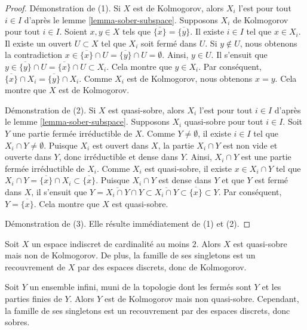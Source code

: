 \begin{proof}
Démonstration de (1). Si $X$ est de Kolmogorov, alors $X_i$ l'est pour tout
$i\in I$ d'après le lemme \ref{lemma-sober-subspace}. Supposons $X_i$ de
Kolmogorov pour tout $i\in I$. Soient $x,y\in X$ tels que
$\overline{\{x\}}=\overline{\{y\}}$. Il existe $i\in I$ tel que $x\in X_i$.
Il existe un ouvert $U\subset X$ tel que $X_i$ soit fermé dans $U$.
Si $y\notin U$, nous obtenons la contradiction
$x\in\overline{\{x\}}\cap U=\overline{\{y\}}\cap U=\emptyset$. Ainsi,
$y\in U$. Il s'ensuit que
$y\in\overline{\{y\}}\cap U=\overline{\{x\}}\cap U\subset X_i$.
Cela montre que $y\in X_i$. Par conséquent,
$\overline{\{x\}}\cap X_i=\overline{\{y\}}\cap X_i$. Comme $X_i$ est de
Kolmogorov, nous obtenons $x=y$. Cela montre que $X$ est de Kolmogorov.

\medskip\noindent
Démonstration de (2). Si $X$ est quasi-sobre, alors $X_i$ l'est pour tout
$i\in I$ d'après le lemme \ref{lemma-sober-subspace}. Supposons $X_i$
quasi-sobre pour tout $i\in I$. Soit $Y$ une partie fermée irréductible de
$X$. Comme $Y\neq\emptyset$, il existe $i\in I$ tel que
$X_i\cap Y\neq\emptyset$. Puisque $X_i$ est ouvert dans $X$, la partie
$X_i\cap Y$ est non vide et ouverte dans $Y$, donc irréductible et dense dans
$Y$. Ainsi, $X_i\cap Y$ est une partie fermée irréductible de $X_i$. Comme
$X_i$ est quasi-sobre, il existe $x\in X_i\cap Y$ tel que
$X_i\cap Y=\overline{\{x\}}\cap X_i\subset\overline{\{x\}}$. Puisque
$X_i\cap Y$ est dense dans $Y$ et que $Y$ est fermé dans $X$, il s'ensuit que
$Y=\overline{X_i\cap Y}\cap Y\subset\overline{X_i\cap Y}\subset
\overline{\{x\}}\subset Y$. Par conséquent,
$Y=\overline{\{x\}}$. Cela montre que $X$ est quasi-sobre.

\medskip\noindent
Démonstration de (3). Elle résulte immédiatement de (1) et (2).
\end{proof}

\begin{example}
\label{example-quasi-sober-not-kolmogorov}
Soit $X$ un espace indiscret de cardinalité au moins $2$. Alors $X$ est
quasi-sobre mais non de Kolmogorov. De plus, la famille de ses singletons est
un recouvrement de $X$ par des espaces discrets, donc de Kolmogorov.
\end{example}

\begin{example}
\label{example-kolmogorov-not-quasi-sober}
Soit $Y$ un ensemble infini, muni de la topologie dont les fermés sont $Y$ et
les parties finies de $Y$. Alors $Y$ est de Kolmogorov mais non quasi-sobre.
Cependant, la famille de ses singletons est un recouvrement par des espaces
discrets, donc sobres.
\end{example}

